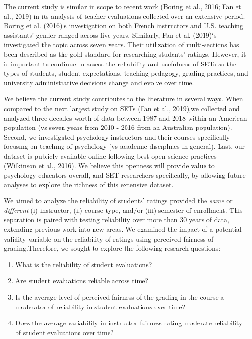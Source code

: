 \documentclass[
  man]{apa7}
\providecommand{\tightlist}{%
  \setlength{\itemsep}{0pt}\setlength{\parskip}{0pt}}
\begin{document}
The current study is similar in scope to recent work (Boring et al., 2016; Fan et al., 2019) in its analysis of teacher evaluations collected over an
extensive period. Boring et al. (2016)`s investigation on both French instructors
and U.S. teaching assistants' gender ranged across five years.
Similarly, Fan et al. (2019)`s investigated the topic across seven years. Their
utilization of multi-sections has been described as the gold standard
for researching students' ratings. However, it is important to continue
to assess the reliability and usefulness of SETs as the types of
students, student expectations, teaching pedagogy, grading practices,
and university administrative decisions change and evolve over time.

We believe the current study contributes to the literature in several
ways. When compared to the next largest study on SETs (Fan et al., 2019),we collected and analyzed three decades worth of data between 1987 and 2018 within an American population (vs seven years from 2010 - 2016 from an Australian population). Second, we investigated psychology instructors and their courses specifically focusing on teaching of psychology (vs academic disciplines in general). Last, our dataset is publicly available online following best open science practices (Wilkinson et al., 2016). We believe this openness will provide value to psychology educators
overall, and SET researchers specifically, by allowing future analyses to
explore the richness of this extensive dataset.

We aimed to analyze the reliability of students' ratings provided the \emph{same} or \emph{different} (i) instructor, (ii) course type, and/or (iii) semester of enrollment. This separation is paired with testing reliability over more than 30 years of data, extending previous work into new areas. We examined the impact of a potential validity variable on the reliability of ratings using perceived fairness of grading.Therefore, we sought to explore the
following research questions:

\begin{enumerate}
\def\labelenumi{\arabic{enumi})}
\tightlist
\item
  What is the reliability of student evaluations?
\item
  Are student evaluations reliable across time?
\item
  Is the average level of perceived fairness of the grading in the
  course a moderator of reliability in student evaluations over time?
\item
  Does the average variability in instructor fairness rating moderate
  reliability of student evaluations over time?
\end{enumerate}
\end{document}
